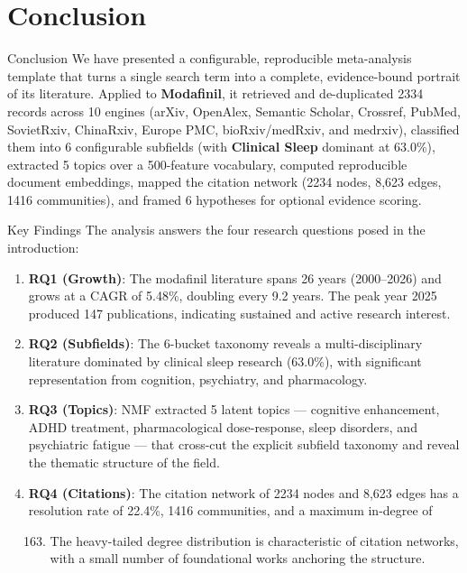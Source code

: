 \documentclass[
  ignorenonframetext,
]{beamer}
\author{\texorpdfstring{}{}}
\date{}
\providecommand{\tightlist}{%
  \setlength{\itemsep}{0pt}\setlength{\parskip}{0pt}}
\begin{document}
\section{Conclusion}\label{conclusion}

\begin{frame}[allowframebreaks]{Conclusion}
We have presented a configurable, reproducible meta-analysis template
that turns a single search term into a complete, evidence-bound portrait
of its literature. Applied to \textbf{Modafinil}, it retrieved and
de-duplicated 2334 records across 10 engines (arXiv, OpenAlex, Semantic
Scholar, Crossref, PubMed, SovietRxiv, ChinaRxiv, Europe PMC,
bioRxiv/medRxiv, and medrxiv), classified them into 6 configurable
subfields (with \textbf{Clinical Sleep} dominant at 63.0\%), extracted 5
topics over a 500-feature vocabulary, computed reproducible document
embeddings, mapped the citation network (2234 nodes, 8,623 edges, 1416
communities), and framed 6 hypotheses for optional evidence scoring.
\end{frame}

\begin{frame}[allowframebreaks]{Key Findings}
\protect{}\label{key-findings}
The analysis answers the four research questions posed in the
introduction:

\begin{enumerate}
\item
  \textbf{RQ1 (Growth)}: The modafinil literature spans 26 years
  (2000--2026) and grows at a CAGR of 5.48\%, doubling every 9.2 years.
  The peak year 2025 produced 147 publications, indicating sustained and
  active research interest.
\item
  \textbf{RQ2 (Subfields)}: The 6-bucket taxonomy reveals a
  multi-disciplinary literature dominated by clinical sleep research
  (63.0\%), with significant representation from cognition, psychiatry,
  and pharmacology.
\item
  \textbf{RQ3 (Topics)}: NMF extracted 5 latent topics --- cognitive
  enhancement, ADHD treatment, pharmacological dose-response, sleep
  disorders, and psychiatric fatigue --- that cross-cut the explicit
  subfield taxonomy and reveal the thematic structure of the field.
\item
  \textbf{RQ4 (Citations)}: The citation network of 2234 nodes and 8,623
  edges has a resolution rate of 22.4\%, 1416 communities, and a maximum
  in-degree of

  \begin{enumerate}
  \setcounter{enumii}{162}
  \tightlist
  \item
    The heavy-tailed degree distribution is characteristic of citation
    networks, with a small number of foundational works anchoring the
    structure.
  \end{enumerate}
\end{enumerate}
\end{frame}
\end{document}

